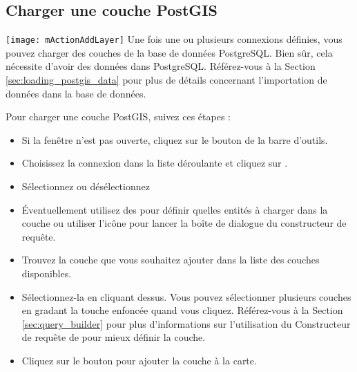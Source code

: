 \subsection{Charger une couche PostGIS}

\texttt{[image: mActionAddLayer]} Une fois une ou plusieurs 
connexions définies, vous pouvez charger des couches de la base de données 
PostgreSQL. Bien sûr, cela nécessite d'avoir des données dans PostgreSQL. 
Référez-vous à la Section \ref{sec:loading_postgis_data} pour plus de 
détails concernant l'importation de données dans la base de données.

Pour charger une couche PostGIS, suivez ces étapes :

\begin{itemize}[label=--]
\item Si la fenêtre  n'est pas 
ouverte, cliquez sur le bouton  de la barre d'outils.
\item Choisissez la connexion dans la liste déroulante et cliquez sur .
\item Sélectionnez ou désélectionnez 
\item Éventuellement utilisez des  pour définir quelles 
entités à charger dans la couche ou utiliser l'icône  
pour lancer la boîte de dialogue du constructeur de requête.

\item Trouvez la couche que vous souhaitez ajouter dans la liste des couches disponibles.
\item Sélectionnez-la en cliquant dessus. Vous pouvez sélectionner plusieurs 
couches en gradant la touche  enfoncée quand vous cliquez. 
Référez-vous à la Section \ref{sec:query_builder} pour plus d'informations 
sur l'utilisation du Constructeur de requête de \psq pour mieux définir la couche.
\item Cliquez sur le bouton  pour ajouter la couche à la carte.
\end{itemize}

